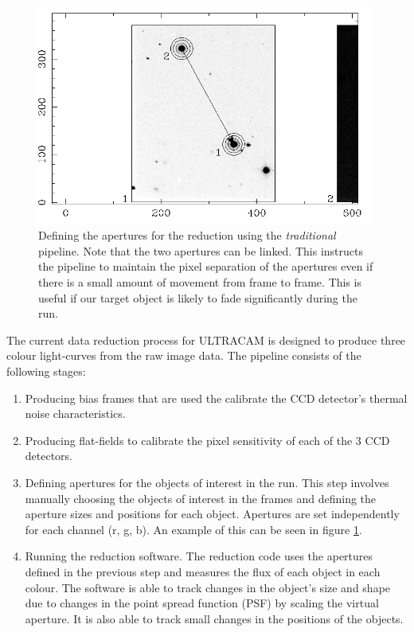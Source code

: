 \begin{figure}
\centering
\includegraphics[width=110mm]{images/setaper.png}
\caption{Defining the apertures for the reduction using the \emph{traditional} pipeline. Note that the two apertures can be linked. This instructs the pipeline to maintain the pixel separation of the apertures even if there is a small amount of movement from frame to frame. This is useful if our target object is likely to fade significantly during the run.}
\label{fig:settingapertures}
\end{figure}

The current data reduction process for ULTRACAM is designed to produce three colour light-curves from the raw image data. The pipeline consists of the following stages:
\begin{enumerate}
	\item Producing bias frames that are used the calibrate the CCD detector's thermal noise characteristics. 
	\item Producing flat-fields to calibrate the pixel sensitivity of each of the 3 CCD detectors. 
	\item Defining apertures for the objects of interest in the run. This step involves manually choosing the objects of interest in the frames and defining the aperture sizes and positions for each object. Apertures are set independently for each channel (r, g, b). An example of this can be seen in figure \ref{fig:settingapertures}.
	\item Running the reduction software. The reduction code uses the apertures defined in the previous step and measures the flux of each object in each colour. The software is able to track changes in the object's size and shape due to changes in the point spread function (PSF) by scaling the virtual aperture. It is also able to track small changes in the positions of the objects. 
\end{enumerate} 

